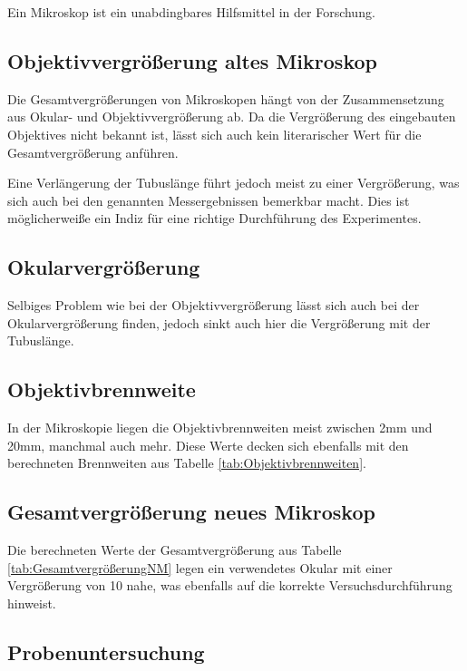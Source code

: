 \documentclass[12pt,a4paper,twoside]{article}
\begin{document}
Ein Mikroskop ist ein unabdingbares Hilfsmittel in der Forschung. 

\subsection{Objektivvergrößerung altes Mikroskop}

Die Gesamtvergrößerungen von Mikroskopen hängt von der Zusammensetzung aus Okular- und Objektivvergrößerung ab.
Da die Vergrößerung des eingebauten Objektives nicht bekannt ist, lässt sich auch kein literarischer Wert für die Gesamtvergrößerung anführen. \newline

\noindent
Eine Verlängerung der Tubuslänge führt jedoch meist zu einer Vergrößerung, was sich auch bei den genannten Messergebnissen bemerkbar macht. 
Dies ist möglicherweiße ein Indiz für eine richtige Durchführung des Experimentes. 

\subsection{Okularvergrößerung}

Selbiges Problem wie bei der Objektivvergrößerung lässt sich auch bei der Okularvergrößerung finden, jedoch sinkt auch hier die Vergrößerung mit der Tubuslänge. 


\subsection{Objektivbrennweite}

In der Mikroskopie liegen die Objektivbrennweiten meist zwischen 2mm und 20mm, manchmal auch mehr. Diese Werte decken sich ebenfalls mit den berechneten Brennweiten aus Tabelle \ref{tab:Objektivbrennweiten}.


\subsection{Gesamtvergrößerung neues Mikroskop}

Die berechneten Werte der Gesamtvergrößerung aus Tabelle \ref{tab:GesamtvergrößerungNM} legen ein verwendetes Okular mit einer Vergrößerung von 10 nahe, was ebenfalls auf die korrekte Versuchsdurchführung hinweist.

\subsection{Probenuntersuchung}
\end{document}
